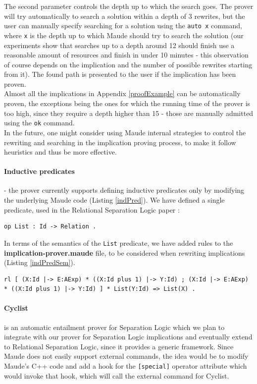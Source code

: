 \documentclass[12pt,a4paper]{article}
\begin{document}
{The second parameter controls the depth up to which the search goes. The prover will try automatically to search a solution within a depth of 3 rewrites, but the user can manually specify searching for a solution using the \texttt{auto x} command, where \texttt{x} is the depth up to which Maude should try to search the solution (our experiments show that searches up to a depth around 12 should finish use a reasonable amount of resources and finish in under 10 minutes - this observation of course depends on the implication and the number of possible rewrites starting from it). The found path is presented to the user if the implication has been proven. 
\\

Almost all the implications in Appendix \ref{proofExample} can be automatically proven, the exceptions being the ones for which the running time of the prover is too high, since they require a depth higher than 15 - those are manually admitted using the \texttt{ok} command.
\\

In the future, one might consider using Maude internal strategies \cite{manual} to control the rewriting and searching in the implication proving process, to make it follow heuristics and thus be more effective.
\paragraph{Inductive predicates} - the prover currently supports defining inductive predicates only by modifying the underlying Maude code (Listing \ref{indPred}). We have defined a single predicate, used in the Relational Separation Logic paper \cite{relational} :
\begin{lstlisting}[caption=Predicate syntax definition,label=indPred]
op List : Id -> Relation . 
\end{lstlisting}
In terms of the semantics of the \texttt{List} predicate, we have added rules to the \textbf{implication-prover.maude} file, to be considered when rewriting implications (Listing \ref{indPredSem}).
\begin{lstlisting}[caption=Example of rule interpreting the List predicate during implication proving,label=indPredSem]
rl [ (X:Id |-> E:AExp) * ((X:Id plus 1) |-> Y:Id) ; (X:Id |-> E:AExp) * ((X:Id plus 1) |-> Y:Id) ] * List(Y:Id) => List(X) .
\end{lstlisting}
\paragraph{Cyclist}\cite{cyclist} \cite{cyclistSite} is an automatic entailment prover for Separation Logic which we plan to integrate with our prover for Separation Logic implications and eventually extend to Relational Separation Logic, since it provides a generic framework. Since Maude does not easily support external commands, the idea would be to modify Maude's C++ code and add a hook for the \texttt{[special]} operator attribute which would invoke that hook, which will call the external command for Cyclist.
}
\end{document}
